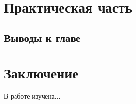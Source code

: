 \documentclass[a4paper,14pt]{article}
\begin{document}
    \section{Практическая часть}

    \subsection{Выводы к главе \thesection}



    \newpage


    \section{Заключение}

    В работе изучена...

    \newpage
    \renewcommand{\refname}{{\normalsize \hfill Список использованных источников \hfill}}
%    
    
    
    \newpage
\end{document}
